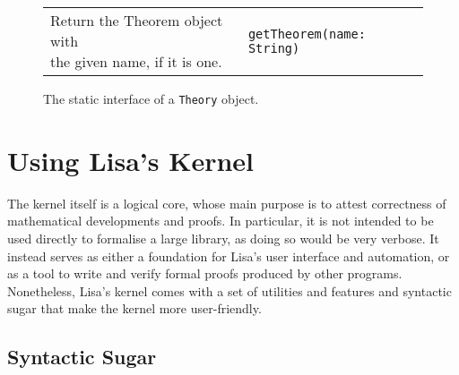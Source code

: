 {\begin{figure}[hp]
\begin{center}
\begin{tabular}{l|l}
            \makecell[l]{Return the Theorem object with   \\the given name, if it is one.} &
            \begin{lstlisting}
getTheorem(name: String)
\end{lstlisting}
            \\ %
          \end{tabular}
          \caption{The static interface of a \lstinline|Theory|{} object.}
          \label{fig:theorygetters}
        \end{center}
      \end{figure}

    \fi
  }

\section{Using Lisa's Kernel}
\label{sec:kernelHelpers}
The kernel itself is a logical core, whose main purpose is to attest correctness of mathematical developments and proofs. In particular, it is not intended to be used directly to formalise a large library, as doing so would be very verbose. It instead serves as either a foundation for Lisa's user interface and automation, or as a tool to write and verify formal proofs produced by other programs.
Nonetheless, Lisa's kernel comes with a set of utilities and features and syntactic sugar that make the kernel more user-friendly.
\subsection{Syntactic Sugar}

